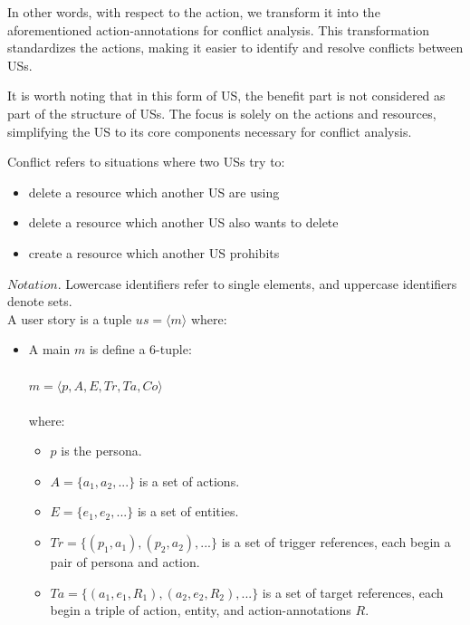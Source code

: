 \begin{definition}
\begin{itemize}
	In other words, with respect to the action, we transform it into the aforementioned action-annotations for conflict analysis. This transformation standardizes the actions, making it easier to identify and resolve conflicts between USs.
	
	It is worth noting that in this form of US, the benefit part is not considered as part of the structure of USs. The focus is solely on the actions and resources, simplifying the US to its core components necessary for conflict analysis.

\end{itemize}
\end{definition}
\newpage
\begin{definition}
	Conflict refers to situations where two USs try to:	 
	\begin{itemize}
		\item delete a resource which another US are using
		\item delete a resource which another US also wants to delete
		\item create a resource which another US prohibits
	\end{itemize}
	$Notation$. Lowercase identifiers refer to single elements, and uppercase identifiers denote sets. 
	\\A user story is a tuple $us = \langle m\rangle $ where:
	\begin{itemize}
		\item A main $m$ is define a 6-tuple: \\\\$m = \langle p,A,E,Tr,Ta,Co\rangle $ \\\\where:
		
	\begin{itemize}
		\item $p$ is the persona.
		
		\item $A = \{ a_1,a_2,...\} $ is a set of actions.
		
		\item $E = \{e_1,e_2,...\}$ is a set of entities.
		
		\item $Tr = \{(p_1,a_1),(p_2,a_2),...\}$ is a set of trigger references, each begin a pair of persona and action.
		
		\item $Ta = \{(a_1,e_1,R_1),(a_2,e_2,R_2),...\}$ is a set of target references, each begin a triple of action, entity, and action-annotations $R$.
		

\end{itemize}
\end{itemize}
\end{definition}
